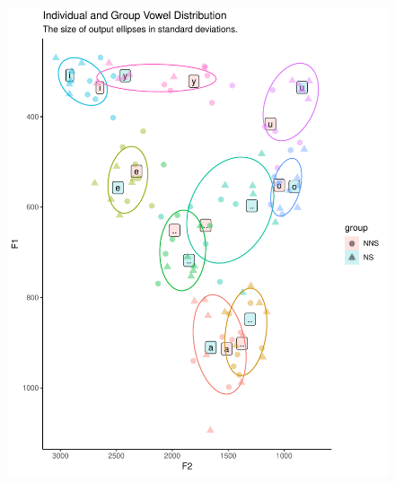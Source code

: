 \documentclass[man, fleqn, noextraspace]{apa6}
\begin{document}
\begin{figure}
\centering
\includegraphics{Vowel_v3_files/figure-latex/figure3-1.pdf}
\caption{}
\end{figure}
\end{document}

